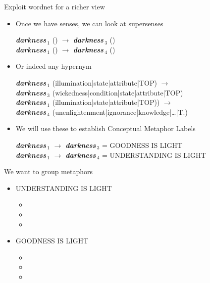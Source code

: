 \documentclass[xetex]{beamer}
\newcommand{\wns}[2]{\textit{\textbf{#1}}\,\ensuremath{_#2}}
\begin{document}
\begin{frame}{Exploit wordnet for a richer view}
  \begin{itemize}
  \item Once we have senses, we can look at supersenses
    \begin{tcolorbox}
      \wns{darkness}{1} () $\rightarrow$  \wns{darkness}{3} ()  \\
      \wns{darkness}{1} () $\rightarrow$  \wns{darkness}{4} () 
    \end{tcolorbox}
   \item Or indeed any hypernym
    \begin{tcolorbox}
      \wns{darkness}{1} (illumination|state|attribute|TOP)  $\rightarrow$ \\
      \hspace*{1em} \wns{darkness}{3} (wickedness|condition|state|attribute|TOP)  \\
      \wns{darkness}{1} (illumination|state|attribute|TOP)) $\rightarrow$  \\
       \hspace*{1em} \wns{darkness}{4} (unenlightenment|ignorance|knowledge|\ldots{}|T.) 
    \end{tcolorbox}
  \item We will use these to establish Conceptual Metaphor Labels
    \begin{tcolorbox}
      \wns{darkness}{1} $\rightarrow$  \wns{darkness}{3}  = GOODNESS IS LIGHT  \\
      \wns{darkness}{1} $\rightarrow$  \wns{darkness}{4}  =  UNDERSTANDING IS LIGHT
    \end{tcolorbox}
  \end{itemize}
\end{frame}



\begin{frame}{We want to group metaphors}

  \begin{itemize}
  \item UNDERSTANDING IS LIGHT
    \begin{itemize}
    \item {}
    \item {}
    \item {}
    \end{itemize}
  \item GOODNESS IS LIGHT
    \begin{itemize}
    \item {}
    \item {}
    \item {}
    \end{itemize}
  \end{itemize}
  
\end{frame}
\end{document}
